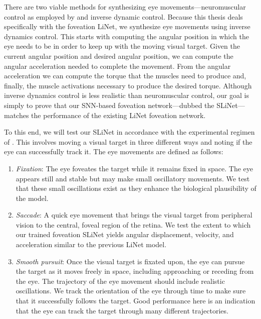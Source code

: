 \documentclass [MS] {UCLAthesis}
\begin{document}
There are two viable methods for synthesizing eye movements---neuromuscular control as employed by \citet{Arjun} and inverse dynamic control. Because this thesis deals specifically with the foveation LiNet, we synthesize eye movements using inverse dynamics control. This starts with computing the angular position in which the eye needs to be in order to keep up with the moving visual target. Given the current angular position and desired angular position, we can compute the angular acceleration needed to complete the movement. From the angular acceleration we can compute the torque that the muscles need to produce and, finally, the muscle activations necessary to produce the desired torque. Although inverse dynamics control is less realistic than neuromuscular control, our goal is simply to prove that our SNN-based foveation network---dubbed the SLiNet---matches the performance of the existing LiNet foveation network.

To this end, we will test our SLiNet in accordance with the experimental regimen of \citet{Arjun}. This involves moving a visual target in three different ways and noting if the eye can successfully track it. The eye movements are defined as follows:
\begin{enumerate}
    \item \textit{Fixation}: The eye foveates the target while it remains fixed in space. The eye appears still and stable but may make small oscillatory movements. We test that these small oscillations exist as they enhance the biological plausibility of the model. 
    \item \textit{Saccade}: A quick eye movement that brings the visual target from peripheral vision to the central, foveal region of the retina. We test the extent to which our trained foveation SLiNet yields angular displacement, velocity, and acceleration similar to the previous LiNet model.
    \item \textit{Smooth pursuit}: Once the visual target is fixated upon, the eye can pursue the target as it moves freely in space, including approaching or receding from the eye. The trajectory of the eye movement should include realistic oscillations. We track the orientation of the eye through time to make sure that it successfully follows the target. Good performance here is an indication that the eye can track the target through many different trajectories.


\end{enumerate}
\end{document}
